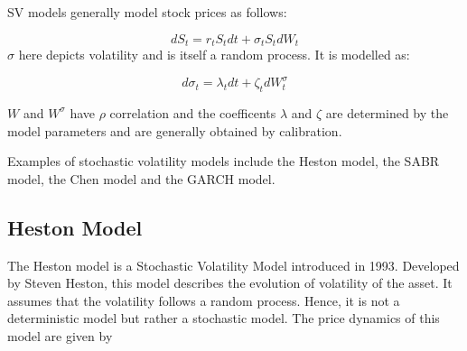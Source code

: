 \documentclass{article}
\begin{document}
SV models generally model stock prices as follows:

\begin{equation}
    dS_t = r_t S_t dt + \sigma_t S_t dW_t
\end{equation}
$\sigma$ here depicts volatility and is itself a random process. It is modelled as:

\begin{equation}
    d\sigma_t = \lambda_t dt + \zeta_t dW^{\sigma}_t
\end{equation}
\newline

$W$ and $W^{\sigma}$ have $\rho$ correlation and the coefficents $\lambda$ and $\zeta$ are determined by the model parameters and are generally obtained by calibration. 
\newline

Examples of stochastic volatility models include the Heston model, the SABR model, the Chen model and the GARCH model.
\newline
\cleardoublepage
\subsection{Heston Model}
The Heston model is a Stochastic Volatility Model introduced in 1993. Developed by Steven Heston, this model describes the evolution of volatility of the asset. It assumes that the volatility follows a random process. Hence, it is not a deterministic model but rather a stochastic model.
The price dynamics of this model are given by
\end{document}
